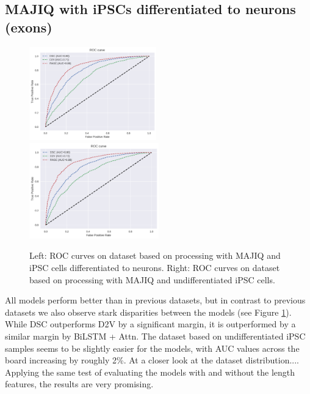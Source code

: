 

\subsection{MAJIQ with iPSCs differentiated to neurons (exons)} \label{sec:hipsci_neuron_majiq}

\begin{figure}
	\centering\includegraphics[width=0.49\textwidth]{../visualizations/ch5-results/majiq_neuron_cross_model_roc_auc_comparison.png} 
	\centering\includegraphics[width=0.5\textwidth]{../visualizations/ch5-results/majiq_ipsc_cross_model_roc_auc_comparison.png} 
	\caption{Left: ROC curves on dataset based on processing with MAJIQ and iPSC cells differentiated to neurons. Right: ROC curves on dataset based on processing with MAJIQ and undifferentiated iPSC cells. }
	\label{fig:majiq_rocs}
\end{figure}

All models perform better than in previous datasets, but in contrast to previous datasets we also observe stark disparities between the models (see Figure \ref{fig:majiq_rocs}). While DSC outperforms D2V by a significant margin, it is outperformed by a similar margin by BiLSTM + Attn. The dataset based on undifferentiated iPSC samples seems to be slightly easier for the models, with AUC values across the board increasing by roughly 2\%. At a closer look at the dataset distribution....
Applying the same test of evaluating the models with and without the length features, the results are very promising. 

